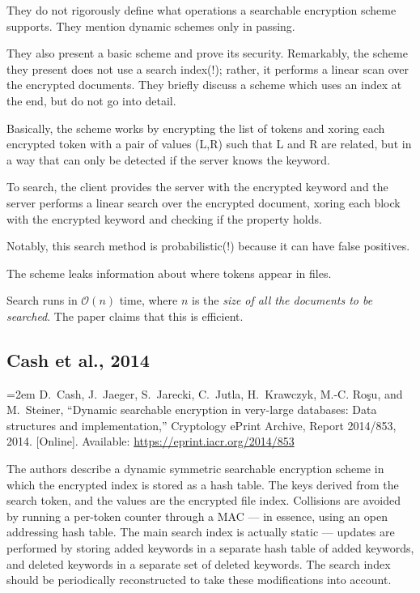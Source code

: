 They do not rigorously define what operations a searchable encryption scheme supports. They mention dynamic schemes only in passing.

They also present a basic scheme and prove its security. Remarkably, the scheme they present does not use a search index(!); rather, it performs a linear scan over the encrypted documents.
They briefly discuss a scheme which uses an index at the end, but do not go into detail.

Basically, the scheme works by encrypting the list of tokens and xoring each encrypted token with a pair of values (L,R) such that L and R are related, but in a way that can only be detected if the server knows the keyword.

To search, the client provides the server with the encrypted keyword and the server performs a linear search over the encrypted document, xoring each block with the encrypted keyword and checking if the property holds.

Notably, this search method is probabilistic(!) because it can have false positives.

The scheme leaks information about where tokens appear in files.

Search runs in $\mathcal{O}(n)$ time, where $n$ is the \textit{size of all the documents to be searched}. The paper claims that this is efficient.

\subsection{Cash et al., 2014}

\begin{flushleft}
\footnotesize
\hangindent=2em
\cite{cash14}
D.~Cash, J.~Jaeger, S.~Jarecki, C.~Jutla, H.~Krawczyk, M.-C. Roşu, and
  M.~Steiner, ``Dynamic searchable encryption in very-large databases: Data
  structures and implementation,'' Cryptology ePrint Archive, Report 2014/853,
  2014. [Online]. Available: \url{https://eprint.iacr.org/2014/853}
\end{flushleft}

The authors describe a dynamic symmetric searchable encryption scheme in which the encrypted index is stored as a hash table. The keys derived from the search token, and the values are the encrypted file index.
Collisions are avoided by running a per-token counter through a MAC
--- in essence, using an open addressing hash table.
The main search index is actually static --- updates are performed by storing added keywords in a separate hash table of added keywords, and deleted keywords in a separate set of deleted keywords. The search index should be periodically reconstructed to take these modifications into account.

